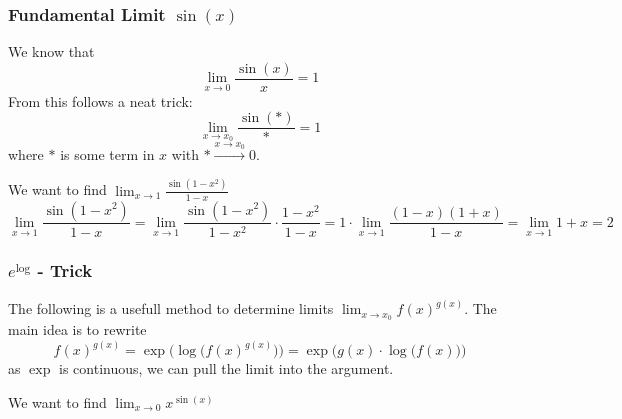 \subsubsection{Fundamental Limit \(\sin(x)\)}
We know that
\[\lim_{x \to 0} \frac{\sin(x)}{x} = 1\]
From this follows a neat trick:
\[\lim_{x \to x_0} \frac{\sin(\ast)}{\ast} = 1\]
where \(\ast\) is some term in \(x\) with \(\ast \xrightarrow{x \to x_0} 0\).
\begin{example}
   We want to find \(\lim_{x \to 1} \frac{\sin(1-x^2)}{1-x}\)
   \[\lim_{x \to 1} \frac{\sin(1-x^2)}{1-x} = \lim_{x \to 1}\frac{\sin(1-x^2)}{1-x^2} \cdot \frac{1-x^2}{1-x} = 1 \cdot \lim_{x \to 1} \frac{(1-x)(1+x)}{1-x} = \lim_{x \to 1} 1 + x = 2\]
\end{example}

\subsubsection{\(e^{\log}\) - Trick}
The following is a usefull method to determine limits \(\lim_{x \to x_0} f(x)^{g(x)}\).
The main idea is to rewrite
\[f(x)^{g(x)} = \exp\Big(\log\big(f(x)^{g(x)}\big)\Big) = \exp\Big(g(x) \cdot \log\big(f(x)\big)\Big)\]
as \(\exp\) is continuous, we can pull the limit into the argument.
\begin{example}
   We want to find \(\lim_{x \to 0} x^{\sin(x)}\)
\end{example}

